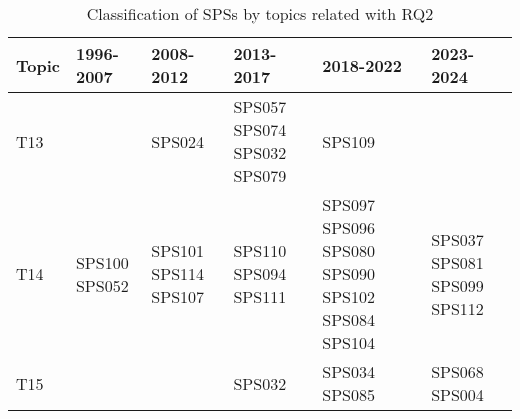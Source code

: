 \begin{table*}[htbp]
    \renewcommand{\arraystretch}{1.3}
    \setlength{\tabcolsep}{3pt} %
    \centering
	\caption{Classification of SPSs by topics related with RQ2}
    \begin{tabular}{p{0.9cm}p{2.7cm}p{2.7cm}p{2.7cm}p{2.7cm}p{2.7cm}}
        \hline
        \textbf{Topic} & \textbf{1996-2007} & \textbf{2008-2012} & \textbf{2013-2017} & \textbf{2018-2022} & \textbf{2023-2024} \\
        \hline
        T13 &  & SPS024 & SPS057 SPS074 SPS032 SPS079 & SPS109 & \\
        T14 & SPS100 SPS052 & SPS101 SPS114 SPS107 & SPS110 SPS094 SPS111 & SPS097 SPS096 SPS080 SPS090 SPS102 SPS084 SPS104 & SPS037 SPS081 SPS099 SPS112 \\
        T15 &  &  & SPS032 & SPS034 SPS085 & SPS068 SPS004 \\
        \hline
    \end{tabular}
	\label{table:sps_classification_by_topic_rq2}
\end{table*}

